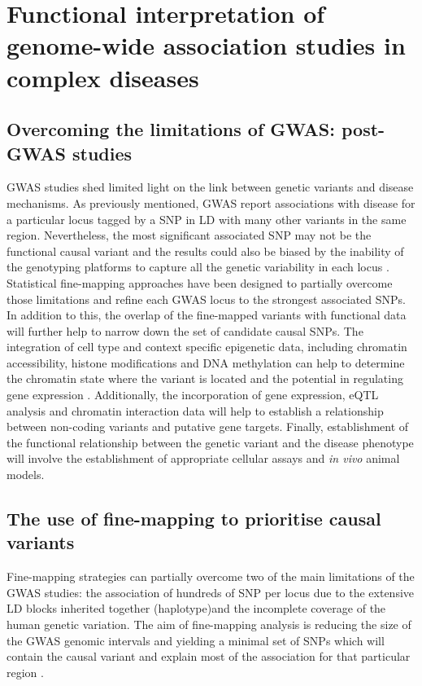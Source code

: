 \section{Functional interpretation of genome-wide association studies in complex diseases}

\subsection{Overcoming the limitations of GWAS: post-GWAS studies}
GWAS studies shed limited light on the link between genetic variants and disease mechanisms. As previously mentioned, GWAS report associations with disease for a particular locus tagged by a SNP in LD with many other variants in the same region. Nevertheless, the most significant associated SNP may not be the functional causal variant and the results could also be biased by the inability of the genotyping platforms to capture all the genetic variability in each locus . Statistical fine-mapping approaches have been designed to partially overcome those limitations and refine each GWAS locus to the strongest associated SNPs. In addition to this, the overlap of the fine-mapped variants with functional data will further help to narrow down the set of candidate causal SNPs. The integration of cell type and context specific epigenetic data, including chromatin accessibility, histone modifications and DNA methylation can help to determine the chromatin state where the variant is located and the potential in regulating gene expression . Additionally, the incorporation of gene expression, eQTL analysis and chromatin interaction data will help to establish a relationship between non-coding variants and putative gene targets. Finally, establishment of the functional relationship between the genetic variant and the disease phenotype will involve the establishment of appropriate cellular assays and \textit{in vivo} animal models.


\subsection{The use of fine-mapping to prioritise causal variants}
Fine-mapping strategies can partially overcome two of the main limitations of the GWAS studies: the association of hundreds of SNP per locus due to the extensive LD blocks inherited together (haplotype)and the incomplete coverage of the human genetic variation. The aim of fine-mapping analysis is reducing the size of the GWAS genomic intervals and yielding a minimal set of SNPs which will contain the causal variant and explain most of the association for that particular region \parencite{Spain2015}.

